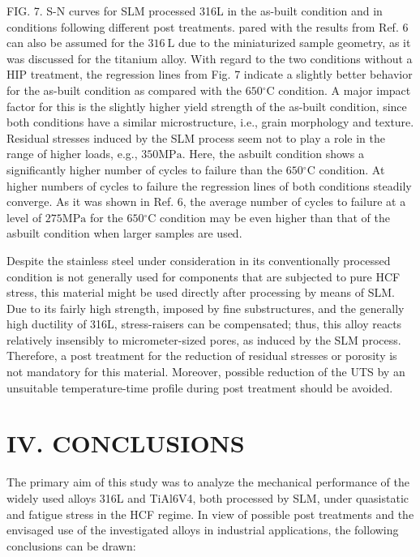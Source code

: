 \documentclass[10pt]{article}
\begin{document}
FIG. 7. S-N curves for SLM processed 316L in the as-built condition and in conditions following different post treatments. pared with the results from Ref. 6 can also be assumed for the $316 \mathrm{~L}$ due to the miniaturized sample geometry, as it was discussed for the titanium alloy. With regard to the two conditions without a HIP treatment, the regression lines from Fig. 7 indicate a slightly better behavior for the as-built condition as compared with the $650{ }^{\circ} \mathrm{C}$ condition. A major impact factor for this is the slightly higher yield strength of the as-built condition, since both conditions have a similar microstructure, i.e., grain morphology and texture. Residual stresses induced by the SLM process seem not to play a role in the range of higher loads, e.g., $350 \mathrm{MPa}$. Here, the asbuilt condition shows a significantly higher number of cycles to failure than the $650{ }^{\circ} \mathrm{C}$ condition. At higher numbers of cycles to failure the regression lines of both conditions steadily converge. As it was shown in Ref. 6, the average number of cycles to failure at a level of $275 \mathrm{MPa}$ for the $650{ }^{\circ} \mathrm{C}$ condition may be even higher than that of the asbuilt condition when larger samples are used.

Despite the stainless steel under consideration in its conventionally processed condition is not generally used for components that are subjected to pure HCF stress, this material might be used directly after processing by means of SLM. Due to its fairly high strength, imposed by fine substructures, and the generally high ductility of 316L, stress-raisers can be compensated; thus, this alloy reacts relatively insensibly to micrometer-sized pores, as induced by the SLM process. Therefore, a post treatment for the reduction of residual stresses or porosity is not mandatory for this material. Moreover, possible reduction of the UTS by an unsuitable temperature-time profile during post treatment should be avoided.

\section*{IV. CONCLUSIONS}
The primary aim of this study was to analyze the mechanical performance of the widely used alloys 316L and TiAl6V4, both processed by SLM, under quasistatic and fatigue stress in the HCF regime. In view of possible post treatments and the envisaged use of the investigated alloys in industrial applications, the following conclusions can be drawn:
\end{document}
